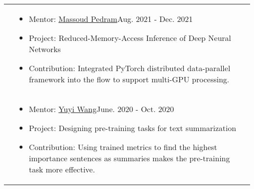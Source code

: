 \documentclass[letterpaper, 10pt]{article}
\begin{document}
\begin{longtable}{p{1.3in}p{4.8in}}
&  \begin{itemize}[leftmargin=10pt, itemsep=-5pt, topsep=0pt,before=\textbf{University of Southern California}]
    \item Mentor: \href{https://mpedram.com/}{Massoud Pedram}\hfill Aug. 2021 - Dec. 2021
    \item Project: Reduced-Memory-Access Inference of Deep Neural Networks\hfill
    \item Contribution: Integrated PyTorch distributed data-parallel framework into the flow to support multi-GPU processing.
  \end{itemize}\\ 

&  \begin{itemize}[leftmargin=10pt, itemsep=-5pt, topsep=0pt,before=\textbf{ETH Zürich}]
    \item Mentor: \href{https://disco.ethz.ch/alumni/yuwang}{Yuyi Wang}\hfill June. 2020 - Oct. 2020
    \item Project: Designing pre-training tasks for text summarization\hfill 
    \item Contribution: Using trained metrics to find the highest importance sentences as summaries makes the pre-training task more effective.
  \end{itemize}\\ 












\end{longtable}
\end{document}
